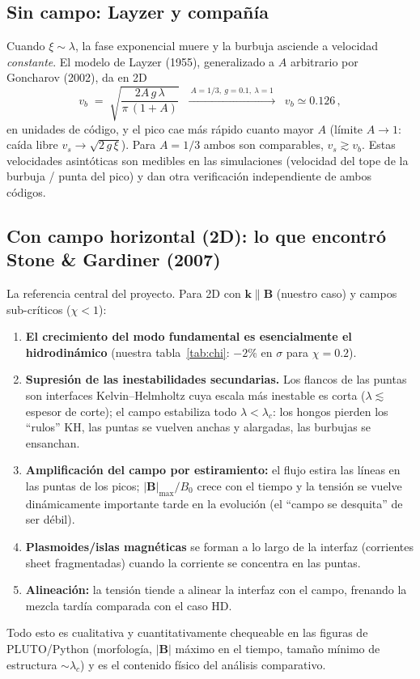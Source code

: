 \documentclass[11pt,a4paper]{article}
\newcommand{\B}{\mathbf{B}}
\begin{document}
\subsection{Sin campo: Layzer y compañía}

Cuando $\xi\sim\lambda$, la fase exponencial muere y la burbuja asciende a velocidad
\emph{constante}. El modelo de Layzer (1955), generalizado a $A$ arbitrario por Goncharov
(2002), da en 2D
\begin{equation}
v_b \;=\; \sqrt{\frac{2A\,g\,\lambda}{\pi\,(1+A)}}
\;\;\xrightarrow{\ A=1/3,\ g=0.1,\ \lambda=1\ }\;\; v_b \simeq 0.126\,,
\label{eq:layzer}
\end{equation}
en unidades de código,
y el pico cae más rápido cuanto mayor $A$ (límite $A\to1$: caída libre
$v_s\to\sqrt{2\,g\,\xi}$). Para $A=1/3$ ambos son comparables, $v_s\gtrsim v_b$.
Estas velocidades asintóticas son medibles en las simulaciones (velocidad del tope de la
burbuja / punta del pico) y dan otra verificación independiente de ambos códigos.

\subsection{Con campo horizontal (2D): lo que encontró Stone \& Gardiner (2007)}

La referencia central del proyecto. Para 2D con $\mathbf{k}\parallel\B$ (nuestro caso) y
campos sub-críticos ($\chi<1$):

\begin{enumerate}[nosep]
  \item \textbf{El crecimiento del modo fundamental es esencialmente el hidrodinámico}
  (nuestra tabla~\ref{tab:chi}: $-2\%$ en $\sigma$ para $\chi=0.2$).
  \item \textbf{Supresión de las inestabilidades secundarias.} Los flancos de las puntas
  son interfaces Kelvin--Helmholtz cuya escala más inestable es corta ($\lambda\lesssim$
  espesor de corte); el campo estabiliza todo $\lambda<\lambda_c$: los hongos pierden los
  ``rulos'' KH, las puntas se vuelven anchas y alargadas, las burbujas se ensanchan.
  \item \textbf{Amplificación del campo por estiramiento:} el flujo estira las líneas en las
  puntas de los picos; $|\B|_\mathrm{max}/B_0$ crece con el tiempo y la tensión se vuelve
  dinámicamente importante tarde en la evolución (el ``campo se desquita'' de ser débil).
  \item \textbf{Plasmoides/islas magnéticas} se forman a lo largo de la interfaz
  (corrientes sheet fragmentadas) cuando la corriente se concentra en las puntas.
  \item \textbf{Alineación:} la tensión tiende a alinear la interfaz con el campo, frenando
  la mezcla tardía comparada con el caso HD.
\end{enumerate}
Todo esto es cualitativa y cuantitativamente chequeable en las figuras de PLUTO/Python
(morfología, $|\B|$ máximo en el tiempo, tamaño mínimo de estructura
$\sim\lambda_c$) y es el contenido físico del análisis comparativo.
\end{document}
